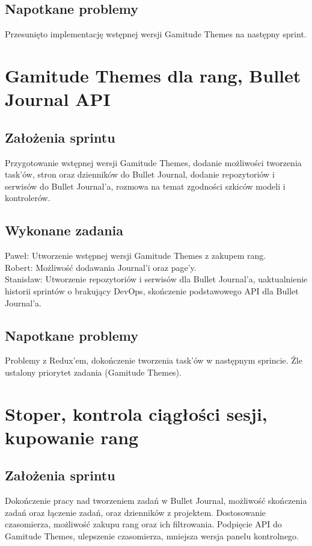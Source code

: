 \documentclass[a4paper,11pt]{report}
\begin{document}
\subsection {Napotkane problemy}
Przesunięto implementację wstępnej wersji Gamitude Themes na następny sprint.

\section {Gamitude Themes dla rang, Bullet Journal API}
\label{sec:system_zarzadzania_stronami_dziennika}
\subsection {Założenia sprintu}
Przygotowanie wstępnej wersji Gamitude Themes, dodanie możliwości tworzenia task'ów, stron oraz dzienników do Bullet Journal, dodanie repozytoriów i serwisów do Bullet Journal'a, rozmowa na temat zgodności szkiców modeli i kontrolerów.
\subsection {Wykonane zadania}
Paweł: Utworzenie wstępnej wersji Gamitude Themes z zakupem rang.\\
Robert: Możliwość dodawania Journal'i oraz page'y.\\
Stanisław: Utworzenie repozytoriów i serwisów dla Bullet Journal'a, uaktualnienie historii sprintów o brakujący DevOps, skończenie podstawowego API dla Bullet Journal'a.\\
\subsection {Napotkane problemy}
Problemy z Redux'em, dokończenie tworzenia task'ów w następnym sprincie. Źle ustalony priorytet zadania (Gamitude Themes).

\section {Stoper, kontrola ciągłości sesji, kupowanie rang}
\subsection {Założenia sprintu}
Dokończenie pracy nad tworzeniem zadań w Bullet Journal, możliwość skończenia zadań oraz łączenie zadań, oraz dzienników z projektem. Dostosowanie czasomierza, możliwość zakupu rang oraz ich filtrowania. Podpięcie API do Gamitude Themes, ulepszenie czasomierza, mniejsza wersja panelu kontrolnego.
\end{document}

